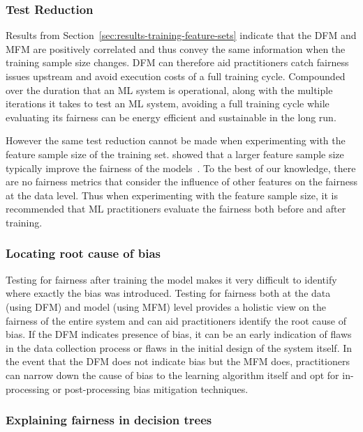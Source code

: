 \documentclass{article}
\begin{document}
\subsubsection{Test Reduction}\label{sec:discuss-test-red}

Results from Section \ref{sec:results-training-feature-sets} indicate
that the DFM and MFM are positively correlated and thus convey the
same information when the training sample size changes. DFM can
therefore aid practitioners catch fairness issues upstream and avoid
execution costs of a full training cycle. Compounded over the duration
that an ML system is operational, along with the multiple iterations
it takes to test an ML system, avoiding a full training cycle while
evaluating its fairness can be energy efficient and sustainable in the
long run.

However the same test reduction cannot be made when experimenting with
the feature sample size of the training
set. \citeauthor{zhang2021ignorance} showed that a larger feature
sample size typically improve the fairness of the
models \cite{zhang2021ignorance}. To the best of our knowledge, there
are no fairness metrics that consider the influence of other features
on the fairness at the data level. Thus when experimenting with the
feature sample size, it is recommended that ML practitioners evaluate
the fairness both before and after training.

\subsubsection{Locating root cause of bias}\label{sec:discuss-root-cause-bias}

Testing for fairness after training the model makes it very difficult
to identify where exactly the bias was introduced. Testing for
fairness both at the data (using DFM) and model (using MFM) level
provides a holistic view on the fairness of the entire system and can
aid practitioners identify the root cause of bias. If the DFM
indicates presence of bias, it can be an early indication of flaws in
the data collection process or flaws in the initial design of the
system itself. In the event that the DFM does not indicate bias but
the MFM does, practitioners can narrow down the cause of bias to the
learning algorithm itself and opt for in-processing or post-processing
bias mitigation techniques.

\subsubsection{Explaining fairness in decision trees}\label{sec:discuss-explain-fair-dt}
\end{document}
